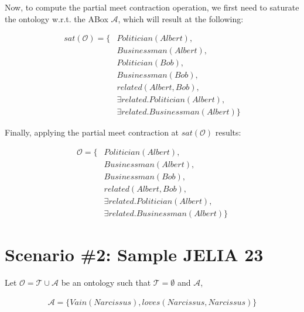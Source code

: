 Now, to compute the partial meet contraction operation, we first need to saturate the ontology w.r.t. the ABox $\mathcal{A}$, which will result at the following:

\begin{equation*}
    \begin{aligned}
        sat(\mathcal{O}) = \{ & Politician(Albert),   \\
                              & Businessman(Albert),  \\
                              & Politician(Bob),      \\
                              & Businessman(Bob),     \\
                              & related(Albert, Bob), \\ 
                              & \exists related.Politician(Albert), \\
                              & \exists related.Businessman(Albert) \}
    \end{aligned}
\end{equation*}

Finally, applying the partial meet contraction at $sat(\mathcal{O})$ results:

\begin{equation*}
    \begin{aligned}
        \mathcal{O} = \{ & Politician(Albert),   \\
                         & Businessman(Albert),  \\
                         & Businessman(Bob),     \\
                         & related(Albert, Bob), \\
                         & \exists related.Politician(Albert), \\
                         & \exists related.Businessman(Albert) \}
    \end{aligned}
\end{equation*}

\section{Scenario \#2: Sample JELIA 23}
\label{sec:scenario-2}
Let $\mathcal{O} = \mathcal{T} \cup \mathcal{A}$ be an ontology such that $\mathcal{T} = \emptyset$ and $\mathcal{A}$,

\begin{equation*}
    \begin{aligned}
        \mathcal{A} = \{ Vain(Narcissus), loves(Narcissus, Narcissus) \}
    \end{aligned}
\end{equation*}


